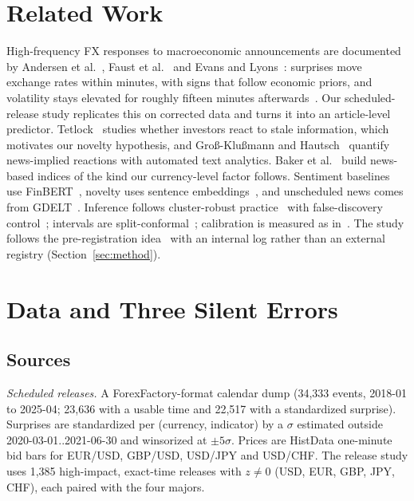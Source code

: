 \documentclass[conference]{IEEEtran}
\begin{document}
\section{Related Work}
High-frequency FX responses to macroeconomic announcements are documented by
Andersen et al.~\cite{abdv2003}, Faust et al.~\cite{faust2007} and Evans and
Lyons~\cite{evanslyons2008}: surprises move exchange rates within minutes, with signs that follow
economic priors, and volatility stays elevated for roughly fifteen minutes afterwards~\cite{ederington1993}. Our
scheduled-release study replicates this on corrected data and turns it into an article-level
predictor. Tetlock~\cite{tetlock2011} studies whether investors react to stale information, which
motivates our novelty hypothesis, and Gro{\ss}-Klu{\ss}mann and Hautsch~\cite{grossklussmann2011}
quantify news-implied reactions with automated text analytics. Baker et al.~\cite{bbd2016} build
news-based indices of the kind our currency-level factor follows. Sentiment baselines use
FinBERT~\cite{araci2019}, novelty uses sentence embeddings~\cite{reimers2019}, and unscheduled
news comes from GDELT~\cite{leetaru2013}. Inference follows cluster-robust
practice~\cite{cameronmiller2015} with false-discovery control~\cite{bh1995}; intervals are
split-conformal~\cite{lei2018}; calibration is measured as in~\cite{guo2017}. The study follows
the pre-registration idea~\cite{nosek2018} with an internal log rather than an external registry
(Section~\ref{sec:method}).

\section{Data and Three Silent Errors}\label{sec:data}
\subsection{Sources}
\emph{Scheduled releases.} A ForexFactory-format calendar dump (34,333 events, 2018-01 to
2025-04; 23,636 with a usable time and 22,517 with a standardized surprise). Surprises are
standardized per (currency, indicator) by a $\sigma$ estimated outside 2020-03-01..2021-06-30 and
winsorized at $\pm5\sigma$. Prices are HistData one-minute bid bars for EUR/USD, GBP/USD, USD/JPY
and USD/CHF. The release study uses 1,385 high-impact, exact-time releases with $z\neq0$ (USD,
EUR, GBP, JPY, CHF), each paired with the four majors.
\end{document}
